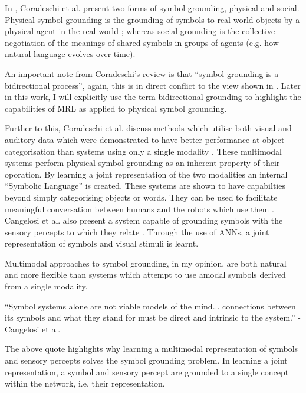 In \cite{coradeschi2013short}, Coradeschi et al. present two forms of symbol grounding, physical and social. Physical symbol grounding is the grounding of symbols to real world objects by a physical agent in the real world \cite{vogt2002physical}; whereas social grounding is the collective negotiation of the meanings of shared symbols in groups of agents \cite{cangelosi2006grounding} (e.g. how natural language evolves over time).

An important note from Coradeschi's review \cite{coradeschi2013short} is that ``symbol grounding is a bidirectional process'', again, this is in direct conflict to the view shown in \cite{lemonlearning, yu2017learning}. Later in this work, I will explicitly use the term bidirectional grounding to highlight the capabilities of \ac{MRL} as applied to physical symbol grounding.

Further to this, Coradeschi et al. discuss methods which utilise both visual and auditory data which were demonstrated to have better performance at object categorisation than systems using only a single modality \cite{coradeschi2013short}. These multimodal systems perform physical symbol grounding as an inherent property of their oporation. By learning a joint representation of the two modalities an internal ``Symbolic Language'' is created. These systems are shown to have capabilties beyond simply categorising objects or words. They can be used to facilitate meaningful conversation between humans and the robots which use them \cite{nakamura2009grounding, nakamura2011grounding}. Cangelosi et al. also present a system capable of grounding symbols with the sensory percepts to which they relate \cite{cangelosi2000robotic}. Through the use of \acp{ANN}, a joint representation of symbols and visual stimuli is learnt.

Multimodal approaches to symbol grounding, in my opinion, are both natural and more flexible than systems which attempt to use amodal symbols derived from a single modality.

\begin{displayquote}
``Symbol systems alone are not viable models of the mind... connections between its symbols and what they stand for must be direct and intrinsic to the system.'' - Cangelosi et al.
\end{displayquote}

The above quote highlights why learning a multimodal representation of symbols and sensory percepts solves the symbol grounding problem. In learning a joint representation, a symbol and sensory percept are grounded to a single concept within the network, i.e. their representation.

